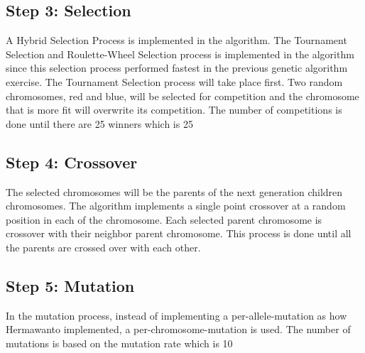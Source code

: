 \documentclass{acm_proc_article-sp}
\begin{document}
\subsection{Step 3: Selection}
A Hybrid Selection Process is implemented in the algorithm. The Tournament Selection and Roulette-Wheel Selection process is implemented in the algorithm since this selection process performed fastest in the previous genetic algorithm exercise. The Tournament Selection process will take place first. Two random chromosomes, red and blue, will be selected for competition and the chromosome that is more fit will overwrite its competition. The number of competitions is done until there are 25 winners which is 25%

\subsection{Step 4: Crossover}
The selected chromosomes will be the parents of the next generation children chromosomes.  The algorithm implements a single point crossover at a random position in each of the chromosome. Each selected parent chromosome is crossover with their neighbor parent chromosome. This process is done until all the parents are crossed over with each other.

\subsection{Step 5: Mutation}
In the mutation process, instead of implementing a per-allele-mutation as how Hermawanto implemented, a per-chromosome-mutation is used. The number of mutations is based on the mutation rate which is 10%
\end{document}
